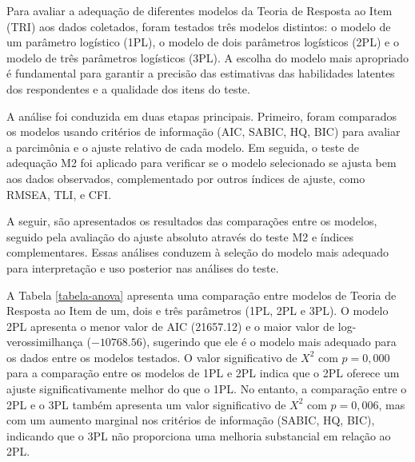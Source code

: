Para avaliar a adequação de diferentes modelos da Teoria de Resposta ao Item (TRI) aos dados coletados, foram testados três modelos distintos: o modelo de um parâmetro logístico (1PL), o modelo de dois parâmetros logísticos (2PL) e o modelo de três parâmetros logísticos (3PL). A escolha do modelo mais apropriado é fundamental para garantir a precisão das estimativas das habilidades latentes dos respondentes e a qualidade dos itens do teste.

A análise foi conduzida em duas etapas principais. Primeiro, foram comparados os modelos usando critérios de informação (AIC, SABIC, HQ, BIC) para avaliar a parcimônia e o ajuste relativo de cada modelo. Em seguida, o teste de adequação M2 foi aplicado para verificar se o modelo selecionado se ajusta bem aos dados observados, complementado por outros índices de ajuste, como RMSEA, TLI, e CFI.

A seguir, são apresentados os resultados das comparações entre os modelos, seguido pela avaliação do ajuste absoluto através do teste M2 e índices complementares. Essas análises conduzem à seleção do modelo mais adequado para interpretação e uso posterior nas análises do teste.


\begin{table}[!htb]
\end{table}

A Tabela \ref{tabela-anova} apresenta uma comparação entre modelos de Teoria de Resposta ao Item de um, dois e três parâmetros (1PL, 2PL e 3PL). O modelo 2PL apresenta o menor valor de AIC (21657.12) e o maior valor de log-verossimilhança ($-10768.56$), sugerindo que ele é o modelo mais adequado para os dados entre os modelos testados. O valor significativo de $X^2$
com $p = 0,000$ para a comparação entre os modelos de 1PL e 2PL indica que o 2PL oferece um ajuste significativamente melhor do que o 1PL. No entanto, a comparação entre o 2PL e o 3PL também apresenta um valor significativo de $X^2$ com $p=0,006$, mas com um aumento marginal nos critérios de informação (SABIC, HQ, BIC), indicando que o 3PL não proporciona uma melhoria substancial em relação ao 2PL. 

